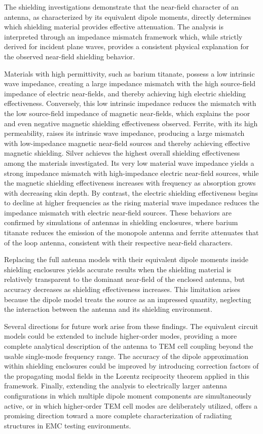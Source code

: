 The shielding investigations demonstrate that the near-field character of an antenna, as characterized by its equivalent dipole moments, directly determines which shielding material provides effective attenuation. The analysis is interpreted through an impedance mismatch framework which, while strictly derived for incident plane waves, provides a consistent physical explanation for the observed near-field shielding behavior. 

Materials with high permittivity, such as barium titanate, possess a low intrinsic wave impedance, creating a large impedance mismatch with the high source-field impedance of electric near-fields, and thereby achieving high electric shielding effectiveness. Conversely, this low intrinsic impedance reduces the mismatch with the low source-field impedance of magnetic near-fields, which explains the poor and even negative magnetic shielding effectiveness observed. Ferrite, with its high permeability, raises its intrinsic wave impedance, producing a large mismatch with low-impedance magnetic near-field sources and thereby achieving effective magnetic shielding. Silver achieves the highest overall shielding effectiveness among the materials investigated. Its very low material wave impedance yields a strong impedance mismatch with high-impedance electric near-field sources, while the magnetic shielding effectiveness increases with frequency as absorption grows with decreasing skin depth. By contrast, the electric shielding effectiveness begins to decline at higher frequencies as the rising material wave impedance reduces the impedance mismatch with electric near-field sources. These behaviors are confirmed by simulations of antennas in shielding enclosures, where barium titanate reduces the emission of the monopole antenna and ferrite attenuates that of the loop antenna, consistent with their respective near-field characters.

Replacing the full antenna models with their equivalent dipole moments inside shielding enclosures yields accurate results when the shielding material is relatively transparent to the dominant near-field of the enclosed antenna, but accuracy decreases as shielding effectiveness increases. This limitation arises because the dipole model treats the source as an impressed quantity, neglecting the interaction between the antenna and its shielding environment.

Several directions for future work arise from these findings. The equivalent circuit models could be extended to include higher-order modes, providing a more complete analytical description of the antenna to TEM cell coupling beyond the usable single-mode frequency range. The accuracy of the dipole approximation within shielding enclosures could be improved by introducing correction factors of the propagating modal fields in the Lorentz reciprocity theorem applied in this framework. Finally, extending the analysis to electrically larger antenna configurations in which multiple dipole moment components are simultaneously active, or in which higher-order TEM cell modes are deliberately utilized, offers a promising direction toward a more complete characterization of radiating structures in EMC testing environments.
